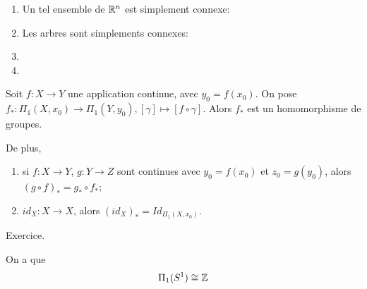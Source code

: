     \begin{exs}
      \begin{enumerate}
      \item Un tel ensemble de $\mathbb{R}^n$ est simplement connexe:
        \begin{center}
      \end{center}
      \item Les arbres sont simplements connexes:
        
      \item 
      \item 
      \end{enumerate}
    \end{exs}

    \begin{prop}
      Soit $f: X \to Y$ une application continue, avec $y_0 = f(x_0)$. On pose $f_\ast: \Pi_1(X, x_0) \to
      \Pi_1(Y, y_0), [\gamma] \mapsto [f \circ \gamma]$. Alors $f_\ast$ est un homomorphisme de groupes.

      De plus, 
      \begin{enumerate}
      \item si $f:X \to Y$, $g: Y \to Z$ sont continues avec $y_0 = f(x_0)$ et $z_0 = g(y_0)$, alors $(g \circ
        f)_\ast = g_\ast \circ f_\ast$;
      \item $id_X : X \to X$, alors $(id_X)_\ast = Id_{\Pi_1(X, x_0)}$.
      \end{enumerate}
    \end{prop}

    \begin{preuve}
      Exercice.
    \end{preuve}

    \begin{theo}
      On a que
        \[\Pi_1(S^1) \cong \mathbb{Z}\]
    \end{theo}

